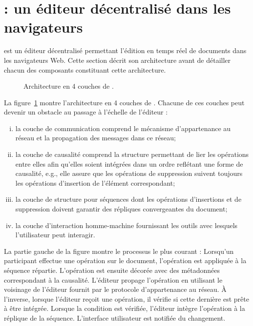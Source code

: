 
\section{\CRATE : un éditeur décentralisé dans les navigateurs}
\label{editor:sec:crate}

\CRATE est un éditeur décentralisé permettant l'édition en temps réel de
documents dans les navigateurs Web. Cette section décrit son architecture avant
de détailler chacun des composants constituant cette architecture.

\begin{figure}
  \begin{center}
    
    \caption[Architecture de \CRATE]
    {\label{editor:fig:architecture}Architecture en 4 couches de \CRATE.}
  \end{center}
\end{figure}

La figure~\ref{editor:fig:architecture} montre l'architecture en 4 couches de
\CRATE. Chacune de ces couches peut devenir un obstacle au passage à l'échelle
de l'éditeur :
\begin{enumerate}[(i)]
\item la couche de communication comprend le mécanisme d'appartenance au réseau
  et la propagation des messages dans ce réseau;
\item la couche de causalité comprend la structure permettant de lier les
  opérations entre elles afin qu'elles soient intégrées dans un ordre reflétant
  une forme de causalité, e.g., elle assure que les opérations de suppression
  suivent toujours les opérations d'insertion de l'élément correspondant;
\item la couche de structure pour séquences dont les opérations d'insertions et
  de suppression doivent garantir des répliques convergeantes du document;
\item la couche d'interaction homme-machine fournissant les outils avec lesquels
  l'utilisateur peut interagir.
\end{enumerate}

\noindent La partie gauche de la figure montre le processus le plus courant :
Lorsqu'un participant effectue une opération sur le document, l'opération est
appliquée à la séquence répartie. L'opération est ensuite décorée avec des
métadonnées correspondant à la causalité. L'éditeur propage l'opération en
utilisant le voisinage de l'éditeur fournit par le protocole d'appartenance au
réseau.  À l'inverse, lorsque l'éditeur reçoit une opération, il vérifie si
cette dernière est prête à être intégrée. Lorsque la condition est vérifiée,
l'éditeur intègre l'opération à la réplique de la séquence. L'interface
utilisateur est notifiée du changement.

